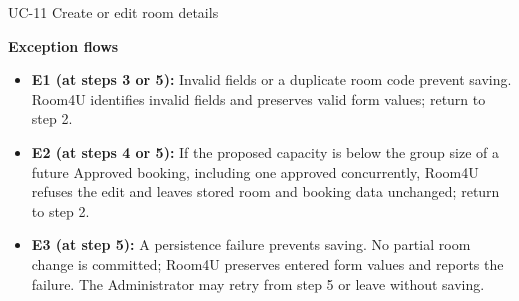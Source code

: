 \begin{usecasebox}{UC-11 Create or edit room details}
\begin{itemize}[label={},leftmargin=0pt,itemsep=1pt,topsep=1pt]
\end{itemize}
\textbf{Exception flows}
\begin{itemize}[label={},leftmargin=0pt,itemsep=1pt,topsep=1pt]
  \item \textbf{E1 (at steps 3 or 5):} Invalid fields or a duplicate room code prevent saving. Room4U identifies invalid fields and preserves valid form values; return to step 2.
  \item \textbf{E2 (at steps 4 or 5):} If the proposed capacity is below the group size of a future Approved booking, including one approved concurrently, Room4U refuses the edit and leaves stored room and booking data unchanged; return to step 2.
  \item \textbf{E3 (at step 5):} A persistence failure prevents saving. No partial room change is committed; Room4U preserves entered form values and reports the failure. The Administrator may retry from step 5 or leave without saving.
\end{itemize}
\end{usecasebox}

